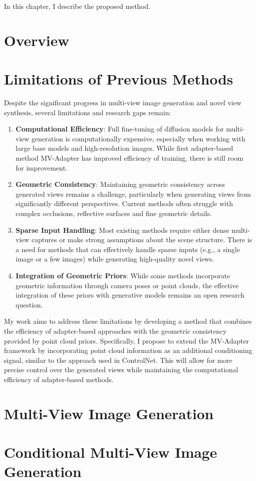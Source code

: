 \label{chapter:proposed-method}

In this chapter, I describe the proposed method.

\section{Overview}

\section{Limitations of Previous Methods}\label{sec:limitations}

Despite the significant progress in multi-view image generation and
novel view synthesis, several limitations and research gaps remain:

\begin{enumerate}
  \item \textbf{Computational Efficiency}: Full fine-tuning of
    diffusion models for multi-view generation is computationally
    expensive, especially when working with large base models and
    high-resolution images. While first adapter-based method
    MV-Adapter has improved efficiency of training, there is still
    room for improvement.

  \item \textbf{Geometric Consistency}: Maintaining geometric
    consistency across generated views remains a challenge,
    particularly when generating views from significantly different
    perspectives. Current methods often struggle with complex
    occlusions, reflective surfaces and fine geometric details.

  \item \textbf{Sparse Input Handling}: Most existing methods require
    either dense multi-view captures or make strong assumptions about
    the scene structure. There is a need for methods that can
    effectively handle sparse inputs (e.g., a single image or a few
    images) while generating high-quality novel views.

  \item \textbf{Integration of Geometric Priors}: While some methods
    incorporate geometric information through camera poses or point
    clouds, the effective integration of these priors with generative
    models remains an open research question.

\end{enumerate}

My work aims to address these limitations by developing a method that
combines the efficiency of adapter-based approaches with the
geometric consistency provided by point cloud priors. Specifically, I
propose to extend the MV-Adapter framework by incorporating point
cloud information as an additional conditioning signal, similar to
the approach used in ControlNet. This will allow for more precise
control over the generated views while maintaining the computational
efficiency of adapter-based methods.

\section{Multi-View Image Generation}

\section{Conditional Multi-View Image Generation}
